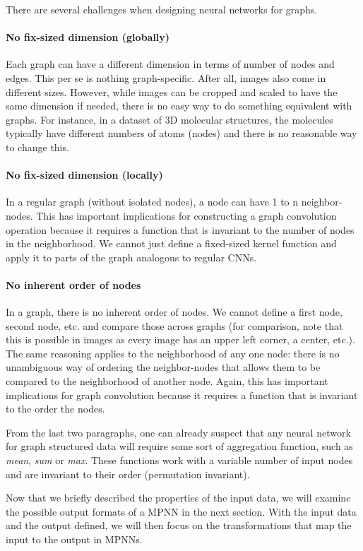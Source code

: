 There are several challenges when designing neural networks for graphs.

\paragraph{No fix-sized dimension (globally)}
Each graph can have a different dimension in terms of number of nodes and edges. This per se is nothing graph-specific. After all, images also come in different sizes. However, while images can be cropped and scaled to have the same dimension if needed, there is no easy way to do something equivalent with graphs. For instance, in a dataset of 3D molecular structures, the molecules typically have different numbers of atoms (nodes) and there is no reasonable way to change this.
\paragraph{No fix-sized dimension (locally)}
In a regular graph (without isolated nodes), a node can have 1 to n neighbor-nodes. This has important implications for constructing a graph convolution operation because it requires a function that is invariant to the number of nodes in the neighborhood. We cannot just define a fixed-sized kernel function and apply it to parts of the graph analogous to regular CNNs.
\paragraph{No inherent order of nodes}
In a graph, there is no inherent order of nodes. We cannot define a first node, second node, etc. and compare those across graphs (for comparison, note that this is possible in images as every image has an upper left corner, a center, etc.). The same reasoning applies to the neighborhood of any one node: there is no unambiguous way of ordering the neighbor-nodes that allows them to be compared to the neighborhood of another node. Again, this has important implications for graph convolution because it requires a function that is invariant to the order the nodes.

From the last two paragraphs, one can already suspect that any neural network for graph structured data will require some sort of aggregation function, such as \textit{mean}, \textit{sum} or  \textit{max}. These functions work with a variable number of input nodes and are invariant to their order (permutation invariant).

Now that we briefly described the properties of the input data, we will examine the possible output formats of a MPNN in the next section. With the input data and the output defined, we will then focus on the transformations that map the input to the output in MPNNs.

